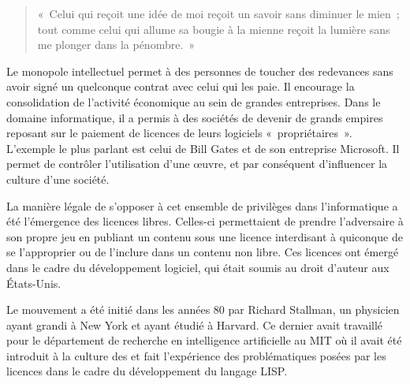 \begin{quote}
«~Celui qui reçoit une idée de moi reçoit un savoir sans diminuer le mien~; tout comme celui qui allume sa bougie à la mienne reçoit la lumière sans me plonger dans la pénombre.~»
\end{quote} %

Le monopole intellectuel permet à des personnes de toucher des redevances sans avoir signé un quelconque contrat avec celui qui les paie. Il encourage la consolidation de l'activité économique au sein de grandes entreprises. Dans le domaine informatique, il a permis à des sociétés de devenir de grands empires reposant sur le paiement de licences de leurs logiciels «~propriétaires~». L'exemple le plus parlant est celui de Bill Gates et de son entreprise Microsoft. Il permet de contrôler l'utilisation d'une œuvre, et par conséquent d'influencer la culture d'une société. %

La manière légale de s'opposer à cet ensemble de privilèges dans l'informatique a été l'émergence des licences libres. Celles-ci permettaient de prendre l'adversaire à son propre jeu en publiant un contenu sous une licence interdisant à quiconque de se l'approprier ou de l'inclure dans un contenu non libre. Ces licences ont émergé dans le cadre du développement logiciel, qui était soumis au droit d'auteur aux États-Unis.

Le mouvement a été initié dans les années 80 par Richard Stallman, un physicien ayant grandi à New York et ayant étudié à Harvard. Ce dernier avait travaillé pour le département de recherche en intelligence artificielle au MIT où il avait été introduit à la culture des  et fait l'expérience des problématiques posées par les licences dans le cadre du développement du langage LISP.

